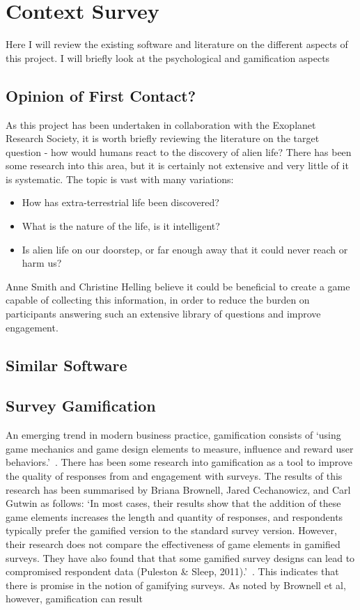 \chapter{Context Survey}

Here I will review the existing software and literature on the different aspects of this project. 
I will briefly look at the psychological and gamification aspects 

\section{Opinion of First Contact?}
As this project has been undertaken in collaboration with the Exoplanet Research Society, it is worth briefly reviewing the literature on the target question - how would humans react to the discovery of alien life? There has been some research\cite{ReactionsToMessage, HowReactDiscovery, Fear} into this area, but it is certainly not extensive and very little of it is systematic. The topic is vast with many variations:
\begin{itemize}
    \item How has extra-terrestrial life been discovered?
    \item What is the nature of the life, is it intelligent?
    \item Is alien life on our doorstep, or far enough away that it could never reach or harm us?
\end{itemize}
Anne Smith and Christine Helling believe it could be beneficial to create a game capable of collecting this information, in order to reduce the burden on participants answering such an extensive library of questions and improve engagement.

\section{Similar Software}

\section{Survey Gamification}
An emerging trend in modern business practice, gamification consists of `using game mechanics and game design elements to measure, influence and reward user behaviors.'~\cite{7804551}. 
There has been some research into gamification as a tool to improve the quality of responses from and engagement with surveys. 
The results of this research has been summarised by Briana Brownell, Jared Cechanowicz, and Carl Gutwin as follows: 
`In most cases, their results show that the addition of these game elements increases the length and quantity of responses, and respondents typically prefer the gamified version to the standard survey version. However, their research does not compare the effectiveness of game elements in gamified surveys. They have also found that that some gamified survey designs can lead to compromised respondent data (Puleston \& Sleep, 2011).'~\cite{SurveyGamificationResearch}.
This indicates that there is promise in the notion of gamifying surveys.
As noted by Brownell et al, however, gamification can result

